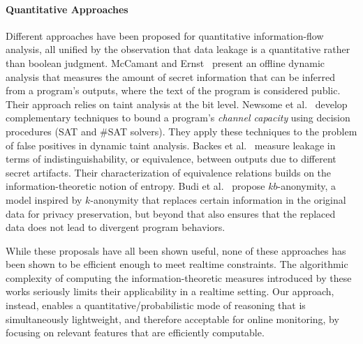 \paragraph{Quantitative Approaches} Different approaches have been proposed for quantitative information-flow analysis, all unified by the observation that data leakage is a quantitative rather than boolean judgment. McCamant and Ernst~\cite{ME:PLDI08} present an offline dynamic analysis that measures the amount of secret information that can be inferred from a program's outputs, where the text of the program is considered public. Their approach relies on taint analysis at the bit level. 
Newsome et al.~\cite{NMS:PLAS09} develop complementary techniques to bound a program's \emph{channel capacity} using decision procedures (SAT and \#SAT solvers). They apply these techniques to the problem of false positives in dynamic taint analysis. Backes et al.~\cite{BKR:SP09} measure leakage in terms of indistinguishability, or equivalence, between outputs due to different secret artifacts. Their characterization of equivalence relations builds on the information-theoretic notion of entropy.
Budi et al.~\cite{BLJL:PLDI11} propose $kb$-anonymity, a model inspired by $k$-anonymity that replaces certain information in the original data for privacy preservation, but beyond that also ensures that the replaced data does not lead to divergent program behaviors.


While these proposals have all been shown useful, none of these approaches has been shown to be efficient enough to meet realtime constraints. The algorithmic complexity of computing the information-theoretic measures introduced by these works seriously limits their applicability in a realtime setting. Our approach, instead, enables a quantitative/probabilistic mode of reasoning that is simultaneously lightweight, and therefore acceptable for online monitoring, by focusing on relevant features that are efficiently computable.

